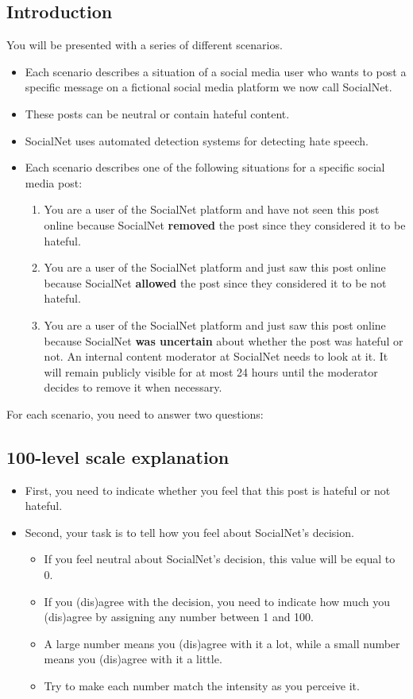 \documentclass[a4paper]{article}
\begin{document}
\subsection{Introduction}
You will be presented with a series of different scenarios.
\begin{itemize}
    \item Each scenario describes a situation of a social media user who wants to post a specific message on a fictional social media platform we now call SocialNet.
    \item These posts can be neutral or contain hateful content.
    \item SocialNet uses automated detection systems for detecting hate speech.
    \item Each scenario describes one of the following situations for a specific social media post:
          \begin{enumerate}
              \item You are a user of the SocialNet platform and have not seen this post online because SocialNet \textbf{removed} the post since they considered it to be hateful.
              \item You are a user of the SocialNet platform and just saw this post online because SocialNet \textbf{allowed} the post since they considered it to be not hateful.
              \item You are a user of the SocialNet platform and just saw this post online because SocialNet \textbf{was uncertain} about whether the post was hateful or not. An internal content moderator at SocialNet needs to look at it. It will remain publicly visible for at most 24 hours until the moderator decides to remove it when necessary.
          \end{enumerate}
\end{itemize}

For each scenario, you need to answer two questions:

\subsection{100-level scale explanation}
\begin{itemize}
    \item First, you need to indicate whether you feel that this post is hateful or not hateful.
    \item Second, your task is to tell how you feel about SocialNet's decision.
          \begin{itemize}
              \item If you feel neutral about SocialNet's decision, this value will be equal to 0.
              \item If you (dis)agree with the decision, you need to indicate how much you (dis)agree by assigning any number between 1 and 100.
              \item A large number means you (dis)agree with it a lot, while a small number means you (dis)agree with it a little.
              \item Try to make each number match the intensity as you perceive it.
          \end{itemize}
\end{itemize}
\end{document}
